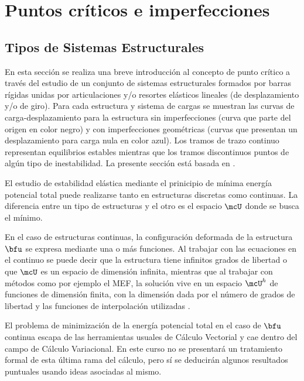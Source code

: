 \section{Puntos críticos e imperfecciones} \label{sec:puntoCritico}



\subsection{Tipos de Sistemas Estructurales} 

En esta sección se realiza una breve introducción al concepto de punto crítico a través del estudio de un conjunto de sistemas estructurales formados por barras rígidas unidas por articulaciones y/o resortes elásticos lineales (de desplazamiento y/o de giro). Para cada estructura y sistema de cargas se muestran las curvas de carga-desplazamiento para la estructura sin imperfecciones (curva que parte del origen en color negro) y con imperfecciones geométricas (curvas que presentan un desplazamiento para carga nula en color azul). Los tramos de trazo continuo representan equilibrios estables mientras que los tramos discontinuos puntos de algún tipo de inestabilidad. La presente sección está basada en \citep{Bazzano2017}.



El estudio de estabilidad elástica mediante el prinicipio de mínima energía potencial total puede realizarse tanto en estructuras discretas como continuas. La diferencia entre un tipo de estructuras y el otro es el espacio $\mcU$ donde se busca el mínimo.

En el caso de estructuras continuas, la configuración deformada de la estructura $\bfu$ se expresa mediante una o más funciones. Al trabajar con las ecuaciones en el continuo se puede decir que la estructura tiene infinitos grados de libertad o que $\mcU$ es un espacio de dimensión infinita, mientras que al trabajar con métodos como por ejemplo el MEF, la solución vive en un espacio $\mcU^h$ de funciones de dimensión finita, con la dimensión dada por el número de grados de libertad y las funciones de interpolación utilizadas \citep{Hughes1987a}.


El problema de minimización de la energía potencial total en el caso de $\bfu$ continua escapa de las herramientas usuales de Cálculo Vectorial y cae dentro del campo de Cálculo Variacional. En este curso no se presentará un tratamiento formal de esta última rama del cálculo, pero sí se deducirán algunos resultados puntuales usando ideas asociadas al mismo.

